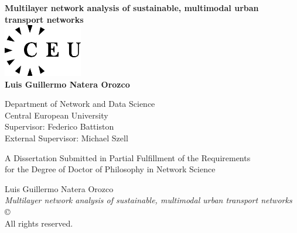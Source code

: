 \documentclass[a4paper,twoside,12pt]{book}
\begin{document}
\begin{titlepage}
	\begin{center}

		\textbf{\LARGE{Multilayer network analysis of sustainable, multimodal urban transport networks}}\\[3.3cm] %

		\includegraphics[width=3.45cm,height=2.3cm]{images/ceulogo.eps}\\[3.4cm]
		{\Large{\textbf{Luis Guillermo Natera Orozco}}}\\[0.4cm]

		\medskip

		Department of Network and Data Science \\
		Central European University\\ [1.2cm]

		Supervisor: Federico Battiston \\
		External Supervisor: Michael Szell

		\vfill

		A Dissertation Submitted in Partial Fulfillment of the Requirements\\ for the Degree of Doctor of Philosophy in Network Science\\[2cm]


		\vspace{1.0cm}
		\the\year
	\end{center}
\end{titlepage}

\newpage

\pagestyle{empty}

\mbox{}

\vfill

\noindent Luis Guillermo Natera Orozco\\
\emph{Multilayer network analysis of sustainable, multimodal urban transport networks}\\ 
\copyright \, \the\year 
\\ All rights reserved.
\end{document}
